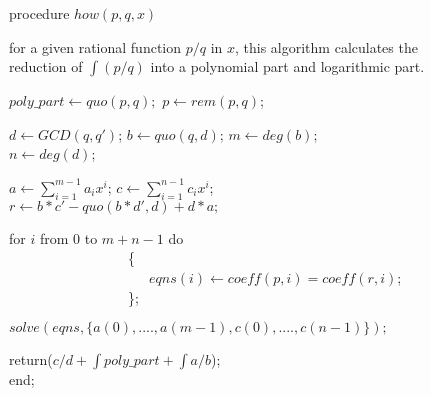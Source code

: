 \begin{flushleft}
procedure $how(p,q,x)$

for a given rational function $p/q$ in $x$, this algorithm calculates the \\
reduction of $\int(p/q)$ into a polynomial part and logarithmic part.

$poly\_part \leftarrow quo(p,q);$ \hspace{3mm} $p \leftarrow rem(p,q)$;

$d \leftarrow GCD(q,q')$; \hspace{3mm} $b \leftarrow quo(q,d)$; \hspace{3mm}
$m \leftarrow deg(b)$; \\
$n \leftarrow deg(d)$;

$a \leftarrow \sum_{i=1}^{m-1} a_{i}x^{i}$; \hspace{3mm}
   $c \leftarrow \sum_{i=1}^{n-1} c_{i}x^{i}$; \\

$r \leftarrow b*c'-quo(b*d',d)+d*a;$

for $i$ from $0$ to $m+n-1$ do \\
~~~~~~~~~~~~~~~~~\{ \\
~~~~~~~~~~~~~~~~~~~~$eqns(i) \leftarrow coeff(p,i)=coeff(r,i)$; \\
~~~~~~~~~~~~~~~~~\};

$solve(eqns,\{a(0),....,a(m-1),c(0),....,c(n-1)\});$

return($c/d+\int poly\_part + \int a/b$); \\
end;
\end{flushleft}

